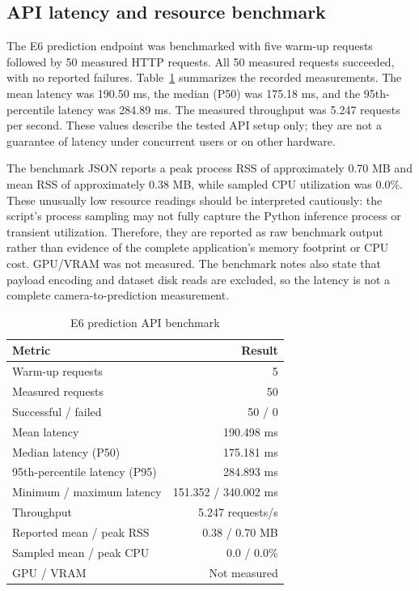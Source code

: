\documentclass[a4paper,conference]{IEEEtran}
\begin{document}
\subsection{API latency and resource benchmark}
The E6 prediction endpoint was benchmarked with five warm-up requests followed by 50 measured HTTP requests. All 50 measured requests succeeded, with no reported failures. Table~\ref{tab:latency} summarizes the recorded measurements. The mean latency was 190.50 ms, the median (P50) was 175.18 ms, and the 95th-percentile latency was 284.89 ms. The measured throughput was 5.247 requests per second. These values describe the tested API setup only; they are not a guarantee of latency under concurrent users or on other hardware.

The benchmark JSON reports a peak process RSS of approximately 0.70 MB and mean RSS of approximately 0.38 MB, while sampled CPU utilization was 0.0\%. These unusually low resource readings should be interpreted cautiously: the script's process sampling may not fully capture the Python inference process or transient utilization. Therefore, they are reported as raw benchmark output rather than evidence of the complete application's memory footprint or CPU cost. GPU/VRAM was not measured. The benchmark notes also state that payload encoding and dataset disk reads are excluded, so the latency is not a complete camera-to-prediction measurement.

\begin{table}[t]
\caption{E6 prediction API benchmark}
\label{tab:latency}
\centering\footnotesize
\begin{tabular}{lr}
\toprule
Metric & Result \\
\midrule
Warm-up requests & 5 \\
Measured requests & 50 \\
Successful / failed & 50 / 0 \\
Mean latency & 190.498 ms \\
Median latency (P50) & 175.181 ms \\
95th-percentile latency (P95) & 284.893 ms \\
Minimum / maximum latency & 151.352 / 340.002 ms \\
Throughput & 5.247 requests/s \\
Reported mean / peak RSS & 0.38 / 0.70 MB \\
Sampled mean / peak CPU & 0.0 / 0.0\% \\
GPU / VRAM & Not measured \\
\bottomrule
\end{tabular}
\end{table}
\end{document}
